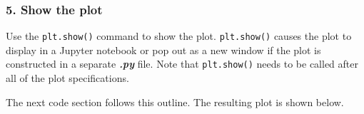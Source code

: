 \documentclass{book}
\newcommand{\passthrough}[1]{#1}
\begin{document}
\hypertarget{show-the-plot}{%
\subsubsection{5. Show the plot}\label{show-the-plot}}

Use the \passthrough{\lstinline!plt.show()!} command to show the plot.
\passthrough{\lstinline!plt.show()!} causes the plot to display in a
Jupyter notebook or pop out as a new window if the plot is constructed
in a separate \textbf{\emph{.py}} file. Note that
\passthrough{\lstinline!plt.show()!} needs to be called after all of the
plot specifications.
    




    
        The next code section follows this outline. The resulting plot is shown
below.
    
\end{document}
